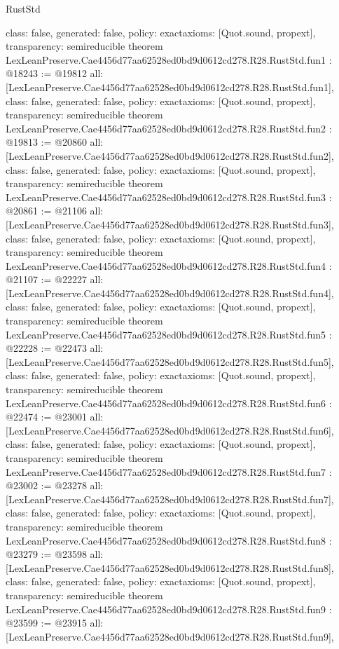 \begin{lexlean}{RustStd}
\begin{coremodule}
{  class: false,
  generated: false,
  policy: exact{axioms: [Quot.sound, propext]},
  transparency: semireducible
}
theorem LexLeanPreserve.Cae4456d77aa62528ed0bd9d0612cd278.R28.RustStd.fun1 : @18243 := @19812 {
  all: [LexLeanPreserve.Cae4456d77aa62528ed0bd9d0612cd278.R28.RustStd.fun1],
  class: false,
  generated: false,
  policy: exact{axioms: [Quot.sound, propext]},
  transparency: semireducible
}
theorem LexLeanPreserve.Cae4456d77aa62528ed0bd9d0612cd278.R28.RustStd.fun2 : @19813 := @20860 {
  all: [LexLeanPreserve.Cae4456d77aa62528ed0bd9d0612cd278.R28.RustStd.fun2],
  class: false,
  generated: false,
  policy: exact{axioms: [Quot.sound, propext]},
  transparency: semireducible
}
theorem LexLeanPreserve.Cae4456d77aa62528ed0bd9d0612cd278.R28.RustStd.fun3 : @20861 := @21106 {
  all: [LexLeanPreserve.Cae4456d77aa62528ed0bd9d0612cd278.R28.RustStd.fun3],
  class: false,
  generated: false,
  policy: exact{axioms: [Quot.sound, propext]},
  transparency: semireducible
}
theorem LexLeanPreserve.Cae4456d77aa62528ed0bd9d0612cd278.R28.RustStd.fun4 : @21107 := @22227 {
  all: [LexLeanPreserve.Cae4456d77aa62528ed0bd9d0612cd278.R28.RustStd.fun4],
  class: false,
  generated: false,
  policy: exact{axioms: [Quot.sound, propext]},
  transparency: semireducible
}
theorem LexLeanPreserve.Cae4456d77aa62528ed0bd9d0612cd278.R28.RustStd.fun5 : @22228 := @22473 {
  all: [LexLeanPreserve.Cae4456d77aa62528ed0bd9d0612cd278.R28.RustStd.fun5],
  class: false,
  generated: false,
  policy: exact{axioms: [Quot.sound, propext]},
  transparency: semireducible
}
theorem LexLeanPreserve.Cae4456d77aa62528ed0bd9d0612cd278.R28.RustStd.fun6 : @22474 := @23001 {
  all: [LexLeanPreserve.Cae4456d77aa62528ed0bd9d0612cd278.R28.RustStd.fun6],
  class: false,
  generated: false,
  policy: exact{axioms: [Quot.sound, propext]},
  transparency: semireducible
}
theorem LexLeanPreserve.Cae4456d77aa62528ed0bd9d0612cd278.R28.RustStd.fun7 : @23002 := @23278 {
  all: [LexLeanPreserve.Cae4456d77aa62528ed0bd9d0612cd278.R28.RustStd.fun7],
  class: false,
  generated: false,
  policy: exact{axioms: [Quot.sound, propext]},
  transparency: semireducible
}
theorem LexLeanPreserve.Cae4456d77aa62528ed0bd9d0612cd278.R28.RustStd.fun8 : @23279 := @23598 {
  all: [LexLeanPreserve.Cae4456d77aa62528ed0bd9d0612cd278.R28.RustStd.fun8],
  class: false,
  generated: false,
  policy: exact{axioms: [Quot.sound, propext]},
  transparency: semireducible
}
theorem LexLeanPreserve.Cae4456d77aa62528ed0bd9d0612cd278.R28.RustStd.fun9 : @23599 := @23915 {
  all: [LexLeanPreserve.Cae4456d77aa62528ed0bd9d0612cd278.R28.RustStd.fun9],
}
\end{coremodule}
\end{lexlean}
